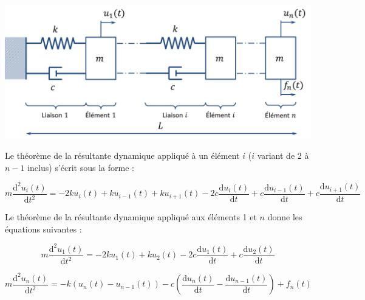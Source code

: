\documentclass[10pt]{article}
\begin{document}
\begin{center}
\includegraphics[width=.9\textwidth]{images/structure}
\end{center}



Le théorème de la résultante dynamique appliqué à un élément $i$ ($i$ variant de 2 à $n-1$ inclus) s'écrit sous la forme : 



\begin{equation}
m\dfrac{\text{d}^2u_i(t)}{\text{d}t^2} = 
- 2 k u_i(t)  + k u_{i-1}(t) + k u_{i+1}(t)
- 2c \dfrac{\text{d}u_i(t)}{\text{d}t}   +c \dfrac{\text{d}u_{i-1}(t)}{\text{d}t} +c \dfrac{\text{d}u_{i+1}(t)}{\text{d}t}
\end{equation}

Le théorème de la résultante dynamique appliqué aux éléments 1 et $n$ donne les équations suivantes : 
%


\begin{equation}
m\dfrac{\text{d}^2u_1(t)}{\text{d}t^2} = 
- 2k u_1(t) + k u_2 (t) 
-2c \dfrac{\text{d}u_1(t)}{\text{d}t} 
+ c \dfrac{\text{d}u_2(t)}{\text{d}t} 
\end{equation}

\begin{equation}
m\dfrac{\text{d}^2u_n(t)}{\text{d}t^2} = 
-k\left(u_n(t)-u_{n-1}(t) \right)   - c\left(\dfrac{\text{d}u_{n}(t)}{\text{d}t}-\dfrac{\text{d}u_{n-1}(t)}{\text{d}t} \right) +f_n(t)
\end{equation}
\end{document}
